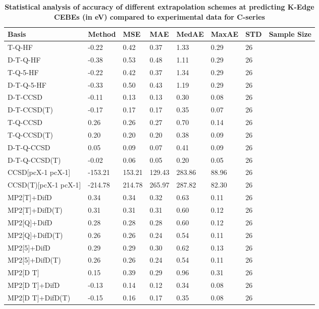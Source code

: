 \begin{table}
  \caption{\textbf{Statistical analysis of accuracy of different extrapolation schemes at predicting K-Edge CEBEs (in eV) compared to experimental data for C-series}}
  \label{tbl:extrap-scheme-summary-c}
  \begin{tabular}{l l l l l l l l }
    \toprule
    \textbf{Basis} & \textbf{Method} & \textbf{MSE} & \textbf{MAE} & \textbf{MedAE} & \textbf{MaxAE} & \textbf{STD} & \textbf{Sample Size} \\ 
    \midrule
    T-Q-HF & -0.22 & 0.42 & 0.37 & 1.33 & 0.29 & 26 \\ 
    D-T-Q-HF & -0.38 & 0.53 & 0.48 & 1.11 & 0.29 & 26 \\ 
    T-Q-5-HF & -0.22 & 0.42 & 0.37 & 1.34 & 0.29 & 26 \\ 
    D-T-Q-5-HF & -0.33 & 0.50 & 0.43 & 1.19 & 0.29 & 26 \\ 
    D-T-CCSD & -0.11 & 0.13 & 0.13 & 0.30 & 0.08 & 26 \\ 
    D-T-CCSD(T) & -0.17 & 0.17 & 0.17 & 0.35 & 0.07 & 26 \\ 
    T-Q-CCSD & 0.26 & 0.26 & 0.27 & 0.70 & 0.14 & 26 \\ 
    T-Q-CCSD(T) & 0.20 & 0.20 & 0.20 & 0.38 & 0.09 & 26 \\ 
    D-T-Q-CCSD & 0.05 & 0.09 & 0.07 & 0.41 & 0.09 & 26 \\ 
    D-T-Q-CCSD(T) & -0.02 & 0.06 & 0.05 & 0.20 & 0.05 & 26 \\ 
    CCSD[pcX-1 pcX-1] & -153.21 & 153.21 & 129.43 & 283.86 & 88.96 & 26 \\ 
    CCSD(T)[pcX-1 pcX-1] & -214.78 & 214.78 & 265.97 & 287.82 & 82.30 & 26 \\ 
    MP2[T]+DifD & 0.34 & 0.34 & 0.32 & 0.63 & 0.11 & 26 \\ 
    MP2[T]+DifD(T) & 0.31 & 0.31 & 0.31 & 0.60 & 0.12 & 26 \\ 
    MP2[Q]+DifD & 0.28 & 0.28 & 0.28 & 0.60 & 0.12 & 26 \\ 
    MP2[Q]+DifD(T) & 0.26 & 0.26 & 0.24 & 0.54 & 0.11 & 26 \\ 
    MP2[5]+DifD & 0.29 & 0.29 & 0.30 & 0.62 & 0.13 & 26 \\ 
    MP2[5]+DifD(T) & 0.26 & 0.26 & 0.24 & 0.54 & 0.11 & 26 \\ 
    MP2[D T] & 0.15 & 0.39 & 0.29 & 0.96 & 0.31 & 26 \\ 
    MP2[D T]+DifD & -0.13 & 0.14 & 0.12 & 0.34 & 0.08 & 26 \\ 
    MP2[D T]+DifD(T) & -0.15 & 0.16 & 0.17 & 0.35 & 0.08 & 26 \\ 

\end{tabular}
\end{table}
